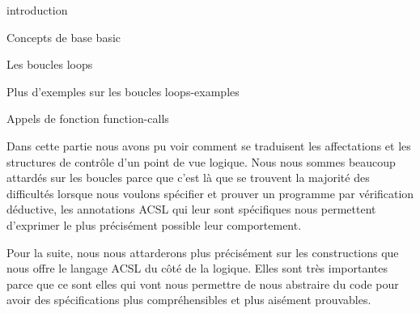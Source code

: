 \begin{levelTwo}
  {}
  {introduction}
\end{levelTwo}


\begin{levelTwo}
  {Concepts de base}
  {basic}
\end{levelTwo}

\begin{levelTwo}
  {Les boucles}
  {loops}
\end{levelTwo}

\begin{levelTwo}
  {Plus d'exemples sur les boucles}
  {loops-examples}
\end{levelTwo}

\begin{levelTwo}
  {Appels de fonction}
  {function-calls}
\end{levelTwo}

\horizontalLine


\newpage


Dans cette partie nous avons pu voir comment se traduisent les affectations et
les structures de contrôle d'un point de vue logique. Nous nous sommes beaucoup 
attardés sur les boucles parce que c'est là que se trouvent la majorité des 
difficultés lorsque nous voulons spécifier et prouver un programme par 
vérification déductive, les annotations ACSL qui leur sont spécifiques nous 
permettent d'exprimer le plus précisément possible leur comportement.



Pour la suite, nous nous attarderons plus précisément sur les constructions
que nous offre le langage ACSL du côté de la logique. Elles sont très 
importantes parce que ce sont elles qui vont nous permettre de nous abstraire
du code pour avoir des spécifications plus compréhensibles et plus aisément 
prouvables.
